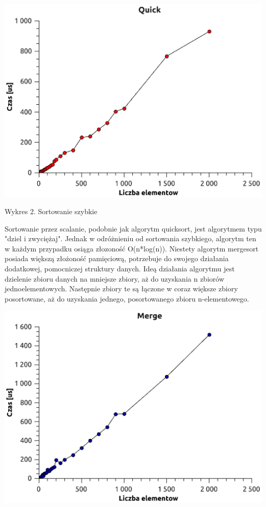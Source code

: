 \documentclass[12pt,a4paper]{article}
\begin{document}
\includegraphics[scale=0.8]{./quick}

Wykres 2. Sortowanie szybkie \newpage

Sortowanie przez scalanie, podobnie jak algorytm quicksort, jest algorytmem typu "dziel i zwyciężaj". Jednak w odróżnieniu od sortowania szybkiego, algorytm ten w każdym przypadku osiąga złozoność O(n*log(n)). Niestety algorytm mergesort posiada większą złożoność pamięciową, potrzebuje do swojego działania dodatkowej, pomocniczej struktury danych.
Ideą działania algorytmu jest dzielenie zbioru danych na mniejsze zbiory, aż do uzyskania n zbiorów jednoelementowych. Następnie zbiory te są łączone w coraz większe zbiory posortowane, aż do uzyskania jednego, posortowanego zbioru n-elementowego.\newline

\includegraphics[scale=0.8]{./merge}
\end{document}
